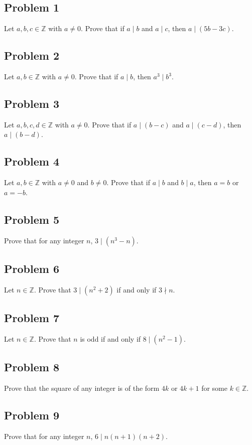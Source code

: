 \documentclass[12pt]{article}
\begin{document}
\subsection{Problem 1}
Let $a, b, c \in \mathbb{Z}$ with $a \neq 0$. Prove that if $a \mid b$ and $a \mid c$, then $a \mid (5b - 3c)$.

\subsection{Problem 2}
Let $a, b \in \mathbb{Z}$ with $a \neq 0$. Prove that if $a \mid b$, then $a^3 \mid b^3$.

\subsection{Problem 3}
Let $a, b, c, d \in \mathbb{Z}$ with $a \neq 0$. Prove that if $a \mid (b - c)$ and $a \mid (c - d)$, then $a \mid (b - d)$.

\subsection{Problem 4}
Let $a, b \in \mathbb{Z}$ with $a \neq 0$ and $b \neq 0$. Prove that if $a \mid b$ and $b \mid a$, then $a = b$ or $a = -b$.

\subsection{Problem 5}
Prove that for any integer $n$, $3 \mid (n^3 - n)$.

\subsection{Problem 6}
Let $n \in \mathbb{Z}$. Prove that $3 \mid (n^2 + 2)$ if and only if $3 \nmid n$.

\subsection{Problem 7}
Let $n \in \mathbb{Z}$. Prove that $n$ is odd if and only if $8 \mid (n^2 - 1)$.

\subsection{Problem 8}
Prove that the square of any integer is of the form $4k$ or $4k + 1$ for some $k \in \mathbb{Z}$.

\subsection{Problem 9}
Prove that for any integer $n$, $6 \mid n(n+1)(n+2)$.
\end{document}
